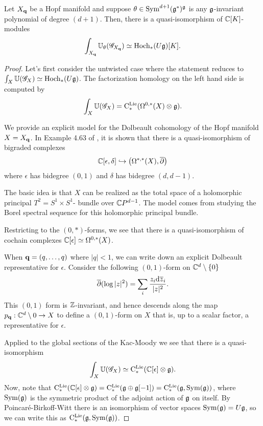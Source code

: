 \begin{prop}
Let $X_{\bf q}$ be a Hopf manifold and suppose $\theta \in {\rm Sym}^{d+1}(\mathfrak g^*)^\mathfrak g$ is any $\mathfrak g$-invariant polynomial of degree $(d+1)$. 
Then, there is a quasi-isomorphism of $\mathbb C[K]$-modules
\[
\int_{X_{\bf q}} \mathbb U_\theta (\mathscr G_{X_{\bf q}}) \simeq {\rm Hoch}_*(U \mathfrak g)[K] .
\]
\end{prop}
\begin{proof}
Let's first consider the untwisted case where the statement reduces to $\int_X \mathbb U (\mathscr G_X) \simeq {\rm Hoch}_*(U \mathfrak g)$.
The factorization homology on the left hand side is computed by
\[
\int_X \mathbb U(\mathscr G_X) = {\rm C}^{\rm Lie}_*(\Omega^{0,*}(X) \otimes \mathfrak g) .
\]

We provide an explicit model for the Dolbeault cohomology of the Hopf manifold $X = X_{\bf q}$. 
In Example 4.63 of \cite{Tanre}, it is shown that there is a quasi-isomorphism of bigraded complexes
\[
\mathbb C[\epsilon,\delta] \hookrightarrow \left(\Omega^{*,*}(X), \overline{\partial}\right)
\]
where $\epsilon$ has bidegree $(0,1)$ and $\delta$ has bidegree $(d,d-1)$. 

\begin{rmk}
The basic idea is that $X$ can be realized as the total space of a holomorphic principal $T^2 = S^1 \times S^1$- bundle over $\mathbb C P^{d-1}$. 
The model comes from studying the Borel spectral sequence for this holomorphic principal bundle.
\end{rmk}

Restricting to the $(0,*)$-forms, we see that there is a quasi-isomorphism of cochain complexes $\mathbb C[\epsilon] \simeq \Omega^{0,*}(X)$. 

\begin{eg}
When ${\bf q} = (q,\ldots,q)$ where $|q| < 1$, we can write down an explicit Dolbeault representative for $\epsilon$. 
Consider the following $(0,1)$-form on $\mathbb C^d \setminus \{0\}$
\[
\overline{\partial} (\log |z|^2) = \sum_i \frac{z_i{\rm d} \overline{z}_i}{|z|^2} .
\]
This $(0,1)$ form is $\mathbb Z$-invariant, and hence descends along the map $p_{\bf q} : \mathbb C^d \setminus 0 \to X$ to define a $(0,1)$-form on $X$ that is, up to a scalar factor, a representative for $\epsilon$. 
\end{eg}

Applied to the global sections of the Kac-Moody we see that there is a quasi-isomorphism
\[
\int_X \mathbb U(\mathscr G_X) \simeq {\rm C}^{\rm Lie}_*(\mathbb C[\epsilon] \otimes \mathfrak g) .
\]
Now, note that ${\rm C}^{\rm Lie}_*(\mathbb C[\epsilon] \otimes \mathfrak g) = {\rm C}^{\rm Lie}_*(\mathfrak g \oplus \mathfrak g[-1]) = {\rm C}^{\rm Lie}_*(\mathfrak g, {\rm Sym} (\mathfrak g))$, where ${\rm Sym}(\mathfrak g)$ is the symmetric product of the adjoint action of $\mathfrak g$ on itself. 
By Poincar\'{e}-Birkoff-Witt there is an isomorphism of vector spaces ${\rm Sym}(\mathfrak g) = U \mathfrak g$, so we can write this as ${\rm C}^{\rm Lie}_*(\mathfrak g, {\rm Sym} (\mathfrak g))$.


\end{proof}
